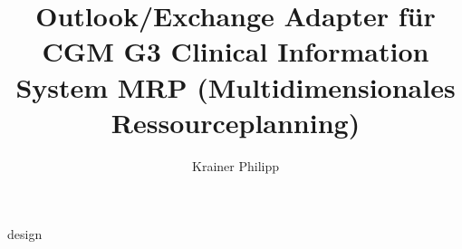 \documentclass[bachelor,german]{hgbthesis}
\begin{document}
\title{Outlook/Exchange Adapter für CGM G3 Clinical Information System MRP (Multidimensionales Ressourceplanning)}
\author{Krainer Philipp}





\tableofcontents

%

\mainmatter


 {design}




\end{document}

